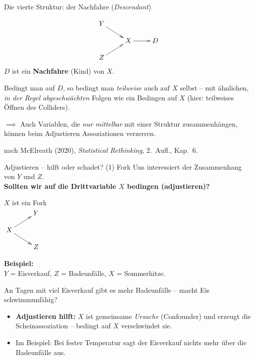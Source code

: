 \documentclass[
  10pt,
  ignorenonframetext,
]{beamer}
\providecommand{\tightlist}{%
  \setlength{\itemsep}{0pt}\setlength{\parskip}{0pt}}
\begin{document}
\begin{frame}{Die vierte Struktur: der Nachfahre (\emph{Descendant})}
\protect\hypertarget{die-vierte-struktur-der-nachfahre-descendant}{}
\columnsbegin
\column{4.5cm}

\begin{displaymath}
\xymatrix@R-1pc{
 Y \ar[dr] & \\
  & X \ar[r] & D \\
 Z \ar[ur] &
}
\end{displaymath} \column{6.5cm} \(D\) ist ein \textbf{Nachfahre} (Kind)
von \(X\).

Bedingt man auf \(D\), so bedingt man \emph{teilweise} auch auf \(X\)
selbst -- mit ähnlichen, \emph{in der Regel abgeschwächten} Folgen wie
ein Bedingen auf \(X\) (hier: teilweises Öffnen des Colliders).
\columnsend

\vspace{1em}

\(\implies\) Auch Variablen, die \emph{nur mittelbar} mit einer Struktur
zusammenhängen, können beim Adjustieren Assoziationen verzerren.

\vspace{0pt plus 1filll}

\tiny nach McElreath (2020), \emph{Statistical Rethinking}, 2.~Aufl.,
Kap.~6.
\end{frame}

\begin{frame}{Adjustieren -- hilft oder schadet? (1) Fork}
\protect\hypertarget{adjustieren-hilft-oder-schadet-1-fork}{}
Uns interessiert der Zusammenhang von \(Y\) und \(Z\).\\
\textbf{Sollten wir auf die Drittvariable \(X\) bedingen (adjustieren)?}

\columnsbegin
\column{3.7cm}
\begin{center}
$X$ ist ein Fork\\[.3em]
$\xymatrix@R-1pc{
 & Y \\ X \ar[ur]\ar[dr] & \\ & Z
}$
\end{center}
\column{7cm}
\small

\textbf{Beispiel:}\\
\(Y\) = Eisverkauf, \(Z\) = Badeunfälle, \(X\) = Sommerhitze.

An Tagen mit viel Eisverkauf gibt es mehr Badeunfälle -- macht Eis
schwimmunfähig? \columnsend

\begin{itemize}[<+->]
\tightlist
\item
  \textbf{Adjustieren hilft:} \(X\) ist gemeinsame \emph{Ursache}
  (Confounder) und erzeugt die Scheinassoziation -- bedingt auf \(X\)
  verschwindet sie.
\item
  Im Beispiel: Bei fester Temperatur sagt der Eisverkauf nichts mehr
  über die Badeunfälle aus.
\end{itemize}
\end{frame}
\end{document}
